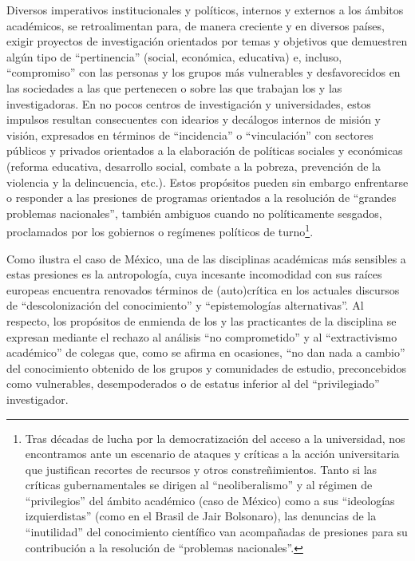 \documentclass[
  spanish,
  11pt,
  a4paper,
]{scrbook}
\begin{document}
Diversos imperativos institucionales y políticos, internos y externos a
los ámbitos académicos, se retroalimentan para, de manera creciente y en
diversos países, exigir proyectos de investigación orientados por temas
y objetivos que demuestren algún tipo de ``pertinencia'' (social,
económica, educativa) e, incluso, ``compromiso'' con las personas y los
grupos más vulnerables y desfavorecidos en las sociedades a las que
pertenecen o sobre las que trabajan los y las investigadoras. En no
pocos centros de investigación y universidades, estos impulsos resultan
consecuentes con idearios y decálogos internos de misión y visión,
expresados en términos de ``incidencia'' o ``vinculación'' con sectores
públicos y privados orientados a la elaboración de políticas sociales y
económicas (reforma educativa, desarrollo social, combate a la pobreza,
prevención de la violencia y la delincuencia, etc.). Estos propósitos
pueden sin embargo enfrentarse o responder a las presiones de programas
orientados a la resolución de ``grandes problemas nacionales'', también
ambiguos cuando no políticamente sesgados, proclamados por los gobiernos
o regímenes políticos de turno\footnote{Tras décadas de lucha por la
  democratización del acceso a la universidad, nos encontramos ante un
  escenario de ataques y críticas a la acción universitaria que
  justifican recortes de recursos y otros constreñimientos. Tanto si las
  críticas gubernamentales se dirigen al ``neoliberalismo'' y al régimen
  de ``privilegios'' del ámbito académico (caso de México) como a sus
  ``ideologías izquierdistas'' (como en el Brasil de Jair Bolsonaro),
  las denuncias de la ``inutilidad'' del conocimiento científico van
  acompañadas de presiones para su contribución a la resolución de
  ``problemas nacionales''.}.

Como ilustra el caso de México, una de las disciplinas académicas más
sensibles a estas presiones es la antropología, cuya incesante
incomodidad con sus raíces europeas encuentra renovados términos de
(auto)crítica en los actuales discursos de ``descolonización del
conocimiento'' y ``epistemologías alternativas''. Al respecto, los
propósitos de enmienda de los y las practicantes de la disciplina se
expresan mediante el rechazo al análisis ``no comprometido'' y al
``extractivismo académico'' de colegas que, como se afirma en ocasiones,
``no dan nada a cambio'' del conocimiento obtenido de los grupos y
comunidades de estudio, preconcebidos como vulnerables, desempoderados o
de estatus inferior al del ``privilegiado'' investigador.
\end{document}
